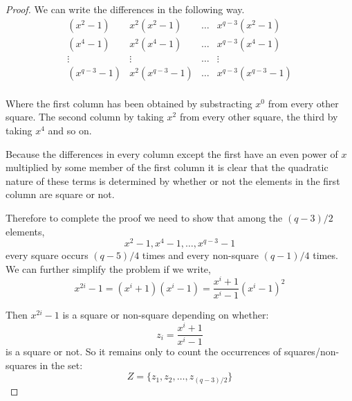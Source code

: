 \begin{proof}
We can write the differences in the following way.
\begin{equation}
\begin{array}{cccc}
     (x^2-1)   &  x^{2}(x^{2}-1)  & \ldots  & x^{q-3}(x^{2}-1)   \\
     (x^4-1)   &  x^{2}(x^{4}-1)  & \ldots  & x^{q-3}(x^{4}-1)   \\
      \vdots   &     \vdots       & \ldots  &      \vdots        \\
   (x^{q-3}-1) & x^{2}(x^{q-3}-1) & \ldots  & x^{q-3}(x^{q-3}-1) \\
\end{array}
\end{equation}

Where the first column has been obtained by substracting $x^0$ from every other square.
The second column by taking $x^2$ from every other square, the third by taking $x^4$ and so on.

Because the differences in every column except the first have an even power of $x$ multiplied by some member of the first column it is clear that the quadratic nature of these terms is determined by whether or not the elements in the first column are square or not.

Therefore to complete the proof we need to show that among the $(q - 3)/2$ elements,
\begin{equation}
  x^2 - 1, x^4 - 1, \ldots, x^{q - 3} - 1
\end{equation}
every square occurs $(q - 5)/4$ times and every non-square $(q - 1)/4$ times.
We can further simplify the problem if we write,
\begin{equation}
x^{2i} - 1 = (x^i + 1)(x^i - 1) = \frac{x^i + 1}{x^i - 1}(x^i - 1)^2
\end{equation}

Then $x^{2i}-1$ is a square or non-square depending on whether:
\begin{equation}
  z_i = \frac{x^i + 1}{x^i - 1}
\end{equation}
is a square or not.
So it remains only to count the occurrences of squares/non-squares in the set:
\begin{equation}
  Z = \{z_1, z_2, \ldots, z_{(q - 3)/2}\}
\end{equation}


\end{proof}
